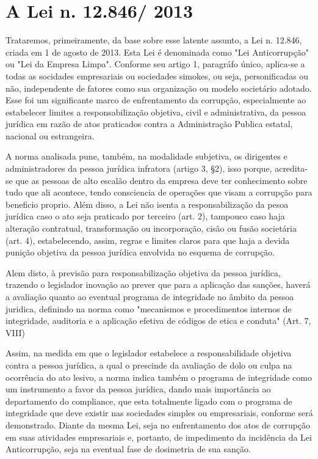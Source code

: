 \chapter{A Lei n. 12.846/ 2013}

Trataremos, primeiramente, da base sobre esse latente assunto, a Lei n. 12.846, criada em 1 de agosto de 2013. Esta Lei é denominada como "Lei Anticorrupção" ou "Lei da Empresa Limpa". Conforme seu artigo 1, paragráfo único, aplica-se a todas as socidades empresariais ou sociedades simokes, ou seja, personificadas ou não, independente de fatores como sua organização ou modelo societário adotado. Esse foi um significante marco de enfrentamento da corrupção, especialmente ao estabelecer limites a responsabilização objetiva, civil e administrativa, da pessoa jurídica em razão de atos praticados contra a Administração Publica estatal, nacional ou estrangeira. 

A norma analisada pune, também, na modalidade subjetiva, os dirigentes e administradores da pessoa jurídica infratora (artigo 3, §2), isso porque, acredita-se que as pessoas de alto escalão dentro da empresa deve ter conhecimento sobre tudo que ali acontece, tendo consciencia de operações que visam a corrupção para beneficio proprio. Além disso, a Lei não isenta a responsabilização da pesoa jurídica caso o ato seja praticado por terceiro (art. 2), tampouco caso haja alteração contratual, transformação ou incorporação, cisão ou fusão societária (art. 4), estabelecendo, assim, regras e limites claros para que haja a devida punição objetiva da pessoa jurídica envolvida no esquema de corrupção. 

Alem disto, à previsão para responsabilização objetiva da pessoa jurídica, trazendo o legislador inovação ao prever que para a aplicação das sanções, haverá a avaliação quanto ao eventual programa de integridade no âmbito da pessoa juridica, definindo na norma como "mecanismos e procedimentos internos de integridade, auditoria e a aplicação efetiva de códigos de etica e conduta" (Art. 7, VIII)

Assim, na medida em que o legislador estabelece a responsabilidade objetiva contra a pessoa jurídica, a qual o prescinde da avaliação de dolo ou culpa na ocorrência do ato lesivo, a norma indica também o programa de integridade como um instrumento a favor da pessoa jurídica, dando mais importância ao departamento do compliance, que esta totalmente ligado com o programa de integridade que deve existir nas sociedades simples ou empresariais, conforme será demonstrado. Diante da mesma Lei, seja no enfrentamento dos atos de corrupção em suas atividades empresariais e, portanto, de impedimento da incidência da Lei Anticorrupção, seja na eventual fase de dosimetria de sua sanção. 

